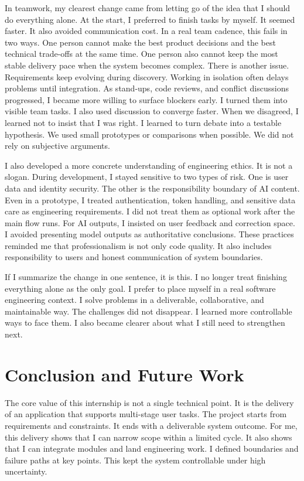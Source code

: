 \documentclass[journal]{IEEEtran}
\begin{document}
In teamwork, my clearest change came from letting go of the idea that I should do everything alone. At the start, I preferred to finish tasks by myself. It seemed faster. It also avoided communication cost. In a real team cadence, this fails in two ways. One person cannot make the best product decisions and the best technical trade-offs at the same time. One person also cannot keep the most stable delivery pace when the system becomes complex. There is another issue. Requirements keep evolving during discovery. Working in isolation often delays problems until integration. As stand-ups, code reviews, and conflict discussions progressed, I became more willing to surface blockers early. I turned them into visible team tasks. I also used discussion to converge faster. When we disagreed, I learned not to insist that I was right. I learned to turn debate into a testable hypothesis. We used small prototypes or comparisons when possible. We did not rely on subjective arguments.

I also developed a more concrete understanding of engineering ethics. It is not a slogan. During development, I stayed sensitive to two types of risk. One is user data and identity security. The other is the responsibility boundary of AI content. Even in a prototype, I treated authentication, token handling, and sensitive data care as engineering requirements. I did not treat them as optional work after the main flow runs. For AI outputs, I insisted on user feedback and correction space. I avoided presenting model outputs as authoritative conclusions. These practices reminded me that professionalism is not only code quality. It also includes responsibility to users and honest communication of system boundaries.

If I summarize the change in one sentence, it is this. I no longer treat finishing everything alone as the only goal. I prefer to place myself in a real software engineering context. I solve problems in a deliverable, collaborative, and maintainable way. The challenges did not disappear. I learned more controllable ways to face them. I also became clearer about what I still need to strengthen next.

\section{Conclusion and Future Work}

The core value of this internship is not a single technical point. It is the delivery of an application that supports multi-stage user tasks. The project starts from requirements and constraints. It ends with a deliverable system outcome. For me, this delivery shows that I can narrow scope within a limited cycle. It also shows that I can integrate modules and land engineering work. I defined boundaries and failure paths at key points. This kept the system controllable under high uncertainty.
\end{document}
